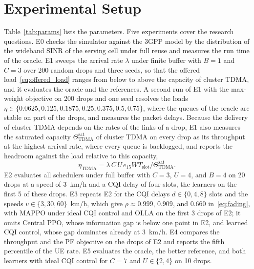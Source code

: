 \documentclass{ieeeaccess}
\begin{document}
\section{Experimental Setup}
\label{sec:setup}
Table~\ref{tab:params} lists the parameters. Five experiments cover the research questions. E0 checks the simulator against the 3GPP model by the distribution of the wideband SINR of the serving cell under full reuse and measures the run time of the oracle. E1 sweeps the arrival rate $\lambda$ under finite buffer with $B = 1$ and $C = 3$ over 200 random drops and three seeds, so that the offered load~\eqref{eq:offered_load} ranges from below to above the capacity of cluster TDMA, and it evaluates the oracle and the references. A second run of E1 with the max-weight objective on 200 drops and one seed resolves the loads $\eta \in \{0.0625, 0.125, 0.1875, 0.25, 0.375, 0.5, 0.75\}$, where the queues of the oracle are stable on part of the drops, and measures the packet delays. Because the delivery of cluster TDMA depends on the rates of the links of a drop, E1 also measures the saturated capacity $\Theta^{\text{sat}}_{\text{TDMA}}$ of cluster TDMA on every drop as its throughput at the highest arrival rate, where every queue is backlogged, and reports the headroom against the load relative to this capacity,
\begin{equation}
\eta_{\text{TDMA}} = \lambda\, C\, U\, e_{15} W T_{\text{slot}} / \Theta^{\text{sat}}_{\text{TDMA}}.
\label{eq:rho_tdma}
\end{equation} E2 evaluates all schedulers under full buffer with $C = 3$, $U = 4$, and $B = 4$ on 20 drops at a speed of 3~km/h and a CQI delay of four slots, the learners on the first 5 of these drops. E3 repeats E2 for the CQI delays $d \in \{0, 4, 8\}$ slots and the speeds $v \in \{3, 30, 60\}$~km/h, which give $\rho \approx 0.999$, $0.909$, and $0.660$ in~\eqref{eq:fading}, with MAPPO under ideal CQI control and OLLA on the first 3 drops of E2; it omits Central PPO, whose information gap is below one point in E2, and learned CQI control, whose gap dominates already at 3~km/h. E4 compares the throughput and the PF objective on the drops of E2 and reports the fifth percentile of the UE rate. E5 evaluates the oracle, the better reference, and both learners with ideal CQI control for $C = 7$ and $U \in \{2, 4\}$ on 10 drops.
\end{document}
